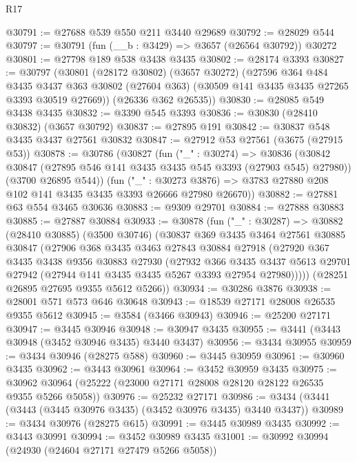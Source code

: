 \begin{lexlean}{R17}
\begin{coremodule}
@30791 := @27688 @539 @550 @211 @3440 @29689
@30792 := @28029 @544
@30797 := @30791 (fun (__b : @3429) => @3657 (@26564 @30792)) @30272
@30801 := @27798 @189 @538 @3438 @3435
@30802 := @28174 @3393
@30827 := @30797
    (@30801
      (@28172 @30802)
      (@3657 @30272)
      (@27596
        @364
        @484
        @3435
        @3437
        @363
        @30802
        (@27604 @363)
        (@30509 @141 @3435 @3435 @27265 @3393 @30519 @27669))
      (@26336 @362 @26535))
@30830 := @28085 @549 @3438 @3435
@30832 := @3390 @545 @3393
@30836 := @30830 (@28410 @30832) (@3657 @30792)
@30837 := @27895 @191
@30842 := @30837 @548 @3435 @3437 @27561 @30832
@30847 := @27912 @53 @27561 (@3675 (@27915 @53))
@30878 := @30786
    (@30827
      (fun ("_" : @30274) =>
      @30836
        (@30842 @30847 (@27895 @546 @141 @3435 @3435 @545 @3393 (@27903 @545) @27980))
        (@3700 @26895 @544))
      (fun ("_" : @30273 @3876) =>
      @3783 @27880 @208 @102 @141 @3435 @3435 @3393 @26666 @27980 @26670))
@30882 := @27881 @63 @554 @3465 @30636
@30883 := @9309 @29701
@30884 := @27888 @30883
@30885 := @27887 @30884
@30933 := @30878
    (fun ("_" : @30287) =>
    @30882
      (@28410 @30885)
      (@3500 @30746)
      (@30837
        @369
        @3435
        @3464
        @27561
        @30885
        @30847
        (@27906
          @368
          @3435
          @3463
          @27843
          @30884
          @27918
          (@27920
            @367
            @3435
            @3438
            @9356
            @30883
            @27930
            (@27932
              @366
              @3435
              @3437
              @5613
              @29701
              @27942
              (@27944 @141 @3435 @3435 @5267 @3393 @27954 @27980)))))
      (@28251 @26895 @27695 @9355 @5612 @5266))
@30934 := @30286 @3876
@30938 := @28001 @571 @573 @646 @30648
@30943 := @18539 @27171 @28008 @26535 @9355 @5612
@30945 := @3584 (@3466 @30943)
@30946 := @25200 @27171
@30947 := @3445 @30946
@30948 := @30947 @3435
@30955 := @3441 (@3443 @30948 (@3452 @30946 @3435) @3440 @3437)
@30956 := @3434 @30955
@30959 := @3434 @30946 (@28275 @588)
@30960 := @3445 @30959
@30961 := @30960 @3435
@30962 := @3443 @30961
@30964 := @3452 @30959 @3435
@30975 := @30962 @30964 (@25222 (@23000 @27171 @28008 @28120 @28122 @26535 @9355 @5266 @5058))
@30976 := @25232 @27171
@30986 := @3434 (@3441 (@3443 (@3445 @30976 @3435) (@3452 @30976 @3435) @3440 @3437))
@30989 := @3434 @30976 (@28275 @615)
@30991 := @3445 @30989 @3435
@30992 := @3443 @30991
@30994 := @3452 @30989 @3435
@31001 := @30992 @30994 (@24930 (@24604 @27171 @27479 @5266 @5058))

\end{coremodule}
\end{lexlean}

